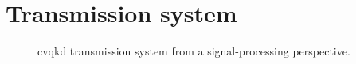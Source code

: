 \section{Transmission system}


\begin{figure}[htb]
	\centering
	
	\caption{\Gls{cvqkd} transmission system from a signal-processing perspective.}
\end{figure}